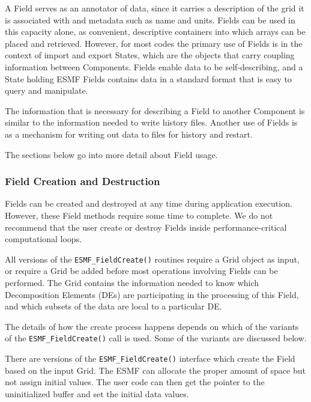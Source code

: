 

A Field serves as an annotator of data, since it carries 
a description of the grid it is associated with and metadata 
such as name and units.  Fields can be used in this capacity
alone, as convenient, descriptive containers into which arrays 
can be placed and retrieved.  However, for most codes the primary 
use of Fields is in the context of import and export States,
which are the objects that carry coupling information between 
Components.  Fields enable data to be self-describing, and a
State holding ESMF Fields contains data in a standard format
that is easy to query and manipulate.  

The information that is necessary for describing a Field to 
another Component is similar to the information needed to write 
history files.  Another use of Fields is as a mechanism for 
writing out data to files for history and restart.

The sections below go into more detail about Field usage.

\subsubsection{Field Creation and Destruction}

Fields can be created and destroyed at any time during 
application execution.  However, these Field methods require 
some time to complete.  We do not recommend that the user
create or destroy Fields inside performance-critical 
computational loops.

All versions of the {\tt ESMF\_FieldCreate()} 
routines require a Grid object as input, or require a Grid
be added before most operations involving Fields can be performed.
The Grid contains the information needed to know which 
Decomposition Elements (DEs) are participating in 
the processing of this Field, and which subsets of the data
are local to a particular DE.

The details of how the create process happens depends 
on which of the variants of the {\tt ESMF\_FieldCreate()} 
call is used.  Some of the variants are discussed below.

There are versions of the {\tt ESMF\_FieldCreate()} interface
which create the Field based on the input Grid.  The ESMF
can allocate the proper amount of 
space but not assign initial values.  The user code
can then get the pointer to the uninitialized buffer and 
set the initial data values.

